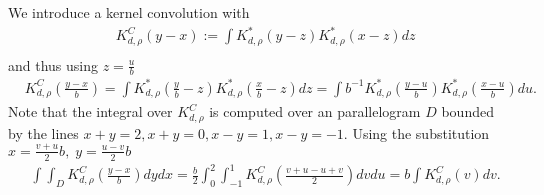 We introduce a kernel convolution with 
\begin{equation}
\begin{split}
	&K_{d,\rho}^{C} \left(y-x \right) := \int K_{d,\rho}^*\left( y-z \right) K_{d,\rho}^*\left(x-z \right) dz \\
\end{split}
\end{equation}
and thus using $z=\frac{u}{b}$%
\begin{equation}
\begin{split}
&K_{d,\rho}^{C} \left(\frac{y-x}{b}  \right) = \int  K_{d,\rho}^*\left( \frac{y}{b} -z \right) K_{d,\rho}^*\left(\frac{x}{b} -z \right) dz= \int b^{-1} K_{d,\rho}^*\left( \frac{y-u}{b}  \right) K_{d,\rho}^*\left( \frac{x-u}{b}  \right) du.
\end{split}
\end{equation}
Note that the integral over $K_{d,\rho}^{C}$ is computed over an  parallelogram $D$ bounded by the lines $x+y=2, x+y=0, x-y=1, x-y=-1$. Using the substitution $x= \frac{v+u}{2}b, \;  y= \frac{u-v}{2}b $
\begin{equation}
\begin{split}
& \int \int_D K_{d,\rho}^{C} \left(\frac{y-x}{b}  \right) dy dx=  \frac{b}{2} \int_{0}^{2} \int_{-1}^{1} K_{d,\rho}^{C} \left( \frac{v+u-u+v}{2} \right)  dv du = b\int K_{d,\rho}^{C} \left( v \right) dv. 
\end{split}
\end{equation}
